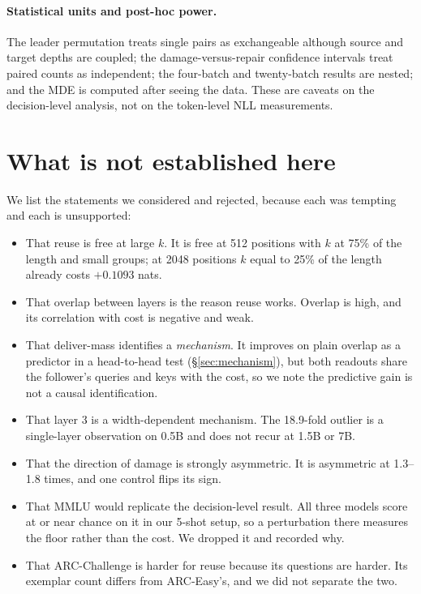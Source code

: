 \documentclass[10pt]{article}
\begin{document}
\paragraph{Statistical units and post-hoc power.} The leader permutation
treats single pairs as exchangeable although source and target depths are
coupled; the damage-versus-repair confidence intervals treat paired counts as
independent; the four-batch and twenty-batch results are nested; and the MDE
is computed after seeing the data. These are caveats on the decision-level
analysis, not on the token-level NLL measurements.

\section{What is not established here}

We list the statements we considered and rejected, because each was tempting
and each is unsupported:

\begin{itemize}
\item That reuse is free at large $k$. It is free at 512 positions with
      $k$ at 75\% of the length and small groups; at 2048 positions
      $k$ equal to 25\% of the length already costs $+0.1093$ nats.
\item That overlap between layers is the reason reuse works. Overlap is high,
      and its correlation with cost is negative and weak.
\item That deliver-mass identifies a \emph{mechanism}. It improves on plain
      overlap as a predictor in a head-to-head test (\S\ref{sec:mechanism}),
      but both readouts share the follower's queries and keys with the cost,
      so we note the predictive gain is not a causal identification.
\item That layer 3 is a width-dependent mechanism. The 18.9-fold outlier is a
      single-layer observation on 0.5B and does not recur at 1.5B or 7B.
\item That the direction of damage is strongly asymmetric. It is asymmetric
      at 1.3--1.8 times, and one control flips its sign.
\item That MMLU would replicate the decision-level result. All three models
      score at or near chance on it in our 5-shot setup, so a perturbation
      there measures the floor rather than the cost. We dropped it and recorded
      why.
\item That ARC-Challenge is harder for reuse because its questions are harder.
      Its exemplar count differs from ARC-Easy's, and we did not separate the
      two.
\end{itemize}
\end{document}
